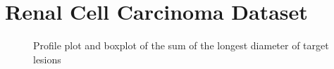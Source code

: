 \section{Renal Cell Carcinoma Dataset}
\label{sec:dataset}

\begin{figure}[t]
    \centering
    \hfill
    \caption{Profile plot and boxplot of the sum of the longest diameter of target lesions}
\end{figure}


